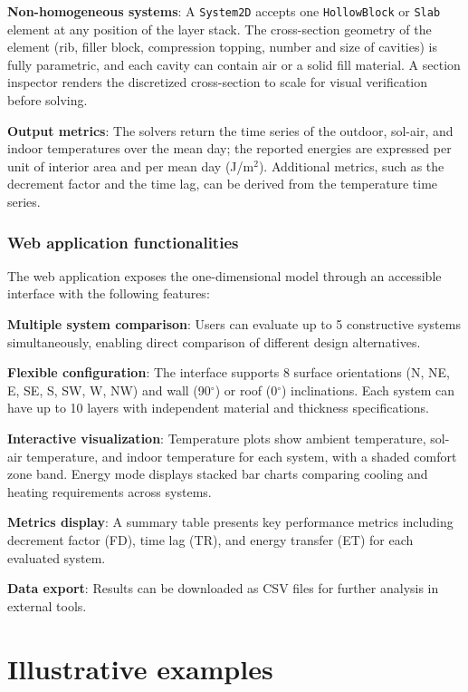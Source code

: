 \documentclass[preprint,12pt, a4paper]{elsarticle}
\begin{document}
\textbf{Non-homogeneous systems}: A \texttt{System2D} accepts one \texttt{HollowBlock} or \texttt{Slab} element at any position of the layer stack. The cross-section geometry of the element (rib, filler block, compression topping, number and size of cavities) is fully parametric, and each cavity can contain air or a solid fill material. A section inspector renders the discretized cross-section to scale for visual verification before solving.

\textbf{Output metrics}: The solvers return the time series of the outdoor, sol-air, and indoor temperatures over the mean day; the reported energies are expressed per unit of interior area and per mean day (J/m$^2$). Additional metrics, such as the decrement factor and the time lag, can be derived from the temperature time series.

\subsubsection{Web application functionalities}

The web application exposes the one-dimensional model through an accessible interface with the following features:

\textbf{Multiple system comparison}: Users can evaluate up to 5 constructive systems simultaneously, enabling direct comparison of different design alternatives.

\textbf{Flexible configuration}: The interface supports 8 surface orientations (N, NE, E, SE, S, SW, W, NW) and wall (90$^\circ$) or roof (0$^\circ$) inclinations. Each system can have up to 10 layers with independent material and thickness specifications.

\textbf{Interactive visualization}: Temperature plots show ambient temperature, sol-air temperature, and indoor temperature for each system, with a shaded comfort zone band. Energy mode displays stacked bar charts comparing cooling and heating requirements across systems.

\textbf{Metrics display}: A summary table presents key performance metrics including decrement factor (FD), time lag (TR), and energy transfer (ET) for each evaluated system.

\textbf{Data export}: Results can be downloaded as CSV files for further analysis in external tools.


\section{Illustrative examples}
\label{sec:examples}
\end{document}
